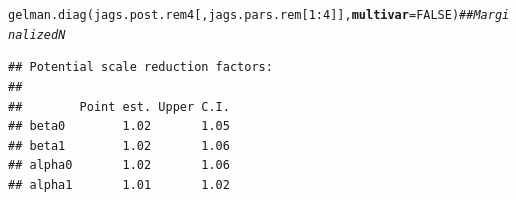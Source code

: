 \documentclass[color=usenames,dvipsnames]{beamer}\usepackage[]{graphicx}\usepackage[]{color}
\makeatletter
\newcommand{\hlnum}[1]{\textcolor[rgb]{0.69,0.494,0}{#1}}%
\newcommand{\hlcom}[1]{\textcolor[rgb]{0.514,0.506,0.514}{\textit{#1}}}%
\newcommand{\hlopt}[1]{\textcolor[rgb]{0,0,0}{#1}}%
\newcommand{\hlstd}[1]{\textcolor[rgb]{0,0,0}{#1}}%
\newcommand{\hlkwc}[1]{\textcolor[rgb]{0,0,0}{\textbf{#1}}}%
\newcommand{\hlkwd}[1]{\textcolor[rgb]{0.004,0.004,0.506}{#1}}%
\newenvironment{kframe}{%
 \def\at@end@of@kframe{}%
 \ifinner\ifhmode%
  \def\at@end@of@kframe{\end{minipage}}%
  \begin{minipage}{\columnwidth}%
 \fi\fi%
 \def\FrameCommand##1{\hskip\@totalleftmargin \hskip-\fboxsep
 \colorbox{shadecolor}{##1}\hskip-\fboxsep
     \hskip-\linewidth \hskip-\@totalleftmargin \hskip\columnwidth}%
 \MakeFramed {\advance\hsize-\width
   \@totalleftmargin\z@ \linewidth\hsize
   \@setminipage}}%
 {\par\unskip\endMakeFramed%
 \at@end@of@kframe}
\newenvironment{knitrout}{}{} %
\makeatother
\begin{document}
\begin{frame}[fragile]
\pause
\vspace{-8pt}
\begin{knitrout}\tiny
{}\color{fgcolor}\begin{kframe}
\begin{alltt}
\hlkwd{gelman.diag}\hlstd{(jags.post.rem4[,jags.pars.rem[}\hlnum{1}\hlopt{:}\hlnum{4}\hlstd{]],} \hlkwc{multivar}\hlstd{=}\hlnum{FALSE}\hlstd{)} \hlcom{## Marginalized N}
\end{alltt}
\begin{verbatim}
## Potential scale reduction factors:
## 
##        Point est. Upper C.I.
## beta0        1.02       1.05
## beta1        1.02       1.06
## alpha0       1.02       1.06
## alpha1       1.01       1.02
\end{verbatim}
\end{kframe}
\end{knitrout}
\end{frame}
\end{document}
